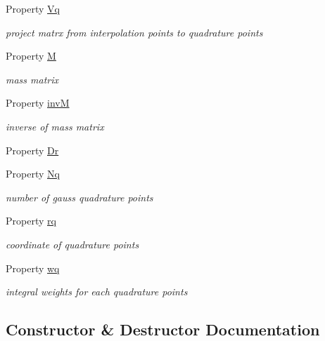 \begin{DoxyCompactItemize}
Property \hyperlink{class_std_prism_quad_ac287bfdad58c5b6e217e27f14b26eed4}{Vq}
\begin{DoxyCompactList}\small\item\em project matrx from interpolation points to quadrature points \end{DoxyCompactList}\item 
Property \hyperlink{class_std_prism_quad_a47bf830708b1f2bcab585be3b2dd1188}{M}
\begin{DoxyCompactList}\small\item\em mass matrix \end{DoxyCompactList}\item 
Property \hyperlink{class_std_prism_quad_a5bb8bd5a5a245ebbccaecf4fbac65e15}{invM}
\begin{DoxyCompactList}\small\item\em inverse of mass matrix \end{DoxyCompactList}\item 
Property \hyperlink{class_std_prism_quad_a93226109cb011332b72d7a277c05d566}{Dr}
\item 
Property \hyperlink{class_std_prism_quad_a8655d59c3b80834fd05e6f1af41c990d}{Nq}
\begin{DoxyCompactList}\small\item\em number of gauss quadrature points \end{DoxyCompactList}\item 
Property \hyperlink{class_std_prism_quad_ab51367a08bf1d895059b25d6db7acb38}{rq}
\begin{DoxyCompactList}\small\item\em coordinate of quadrature points \end{DoxyCompactList}\item 
Property \hyperlink{class_std_prism_quad_abceb74ec7c8fedbd0c59d9f755e8ecfc}{wq}
\begin{DoxyCompactList}\small\item\em integral weights for each quadrature points \end{DoxyCompactList}\end{DoxyCompactItemize}


\subsection{Constructor \& Destructor Documentation}
\mbox{\label{class_std_prism_quad_a558f1aa00ffa8172acbe797ce8eac96c}} 
